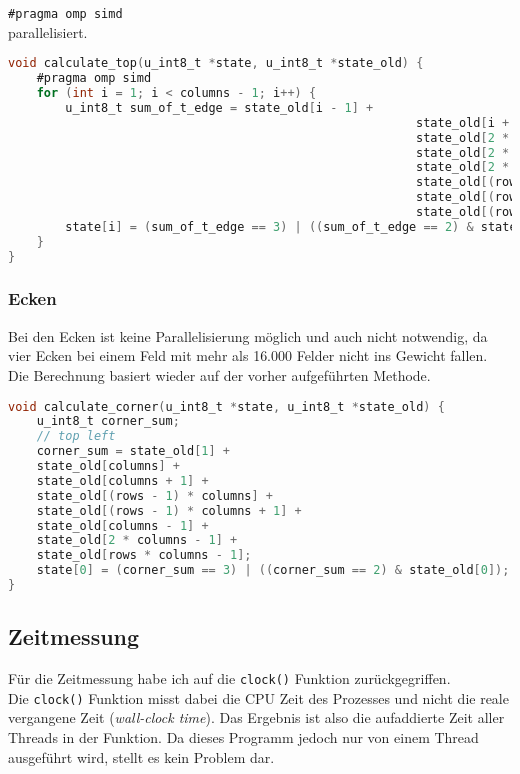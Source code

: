 \documentclass[german,plainarticle,hyperref,utf8]{zihpub}
\begin{document}
	\texttt{\#pragma omp simd}\\
	
	parallelisiert.	
	\begin{lstlisting}[language=C, caption=Berechnung der obersten Zeile]
void calculate_top(u_int8_t *state, u_int8_t *state_old) {
	#pragma omp simd
	for (int i = 1; i < columns - 1; i++) {
		u_int8_t sum_of_t_edge = state_old[i - 1] +
														 state_old[i + 1] +
														 state_old[2 * columns + (i - 1)] +
														 state_old[2 * columns + i] +
														 state_old[2 * columns + (i + 1)] +
														 state_old[(rows - 1) * columns + i] +
														 state_old[(rows - 1) * columns + i + 1] +
														 state_old[(rows - 1) * columns + i - 1];
		state[i] = (sum_of_t_edge == 3) | ((sum_of_t_edge == 2) & state_old[i]);
	}
}\end{lstlisting}

	\subsubsection{Ecken}
	Bei den Ecken ist keine Parallelisierung möglich und auch nicht notwendig, da vier Ecken bei einem Feld mit mehr als 16.000 Felder nicht ins Gewicht fallen.\\
	Die Berechnung basiert wieder auf der vorher aufgeführten Methode.\\
	
	\begin{lstlisting}[language=C, caption=Berechnung der Ecke oben links]
void calculate_corner(u_int8_t *state, u_int8_t *state_old) {
	u_int8_t corner_sum;
	// top left
	corner_sum = state_old[1] +
	state_old[columns] +
	state_old[columns + 1] +
	state_old[(rows - 1) * columns] +
	state_old[(rows - 1) * columns + 1] +
	state_old[columns - 1] +
	state_old[2 * columns - 1] +
	state_old[rows * columns - 1];
	state[0] = (corner_sum == 3) | ((corner_sum == 2) & state_old[0]);
}\end{lstlisting}
	
	\subsection{Zeitmessung}
	
	Für die Zeitmessung habe ich auf die \texttt{clock()} Funktion zurückgegriffen.\\
	
	Die \texttt{clock()} Funktion misst dabei die CPU Zeit des Prozesses und nicht die reale vergangene Zeit (\textit{wall-clock time}). Das Ergebnis ist also die aufaddierte Zeit aller Threads in der Funktion. Da dieses Programm jedoch nur von einem Thread ausgeführt wird, stellt es kein Problem dar.\\
	
\end{document}
